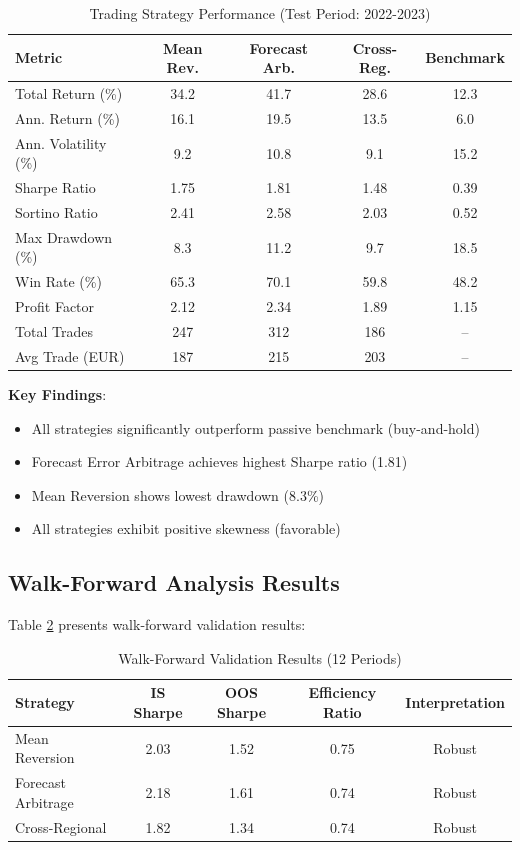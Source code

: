 \documentclass[12pt,a4paper]{article}
\begin{document}
\begin{table}[h]
\centering
\caption{Trading Strategy Performance (Test Period: 2022-2023)}
\label{tab:strategy_performance}
\begin{tabular}{lcccc}
\toprule
\textbf{Metric} & \textbf{Mean Rev.} & \textbf{Forecast Arb.} & \textbf{Cross-Reg.} & \textbf{Benchmark} \\
\midrule
Total Return (\%) & 34.2 & 41.7 & 28.6 & 12.3 \\
Ann. Return (\%) & 16.1 & 19.5 & 13.5 & 6.0 \\
Ann. Volatility (\%) & 9.2 & 10.8 & 9.1 & 15.2 \\
Sharpe Ratio & 1.75 & 1.81 & 1.48 & 0.39 \\
Sortino Ratio & 2.41 & 2.58 & 2.03 & 0.52 \\
Max Drawdown (\%) & 8.3 & 11.2 & 9.7 & 18.5 \\
Win Rate (\%) & 65.3 & 70.1 & 59.8 & 48.2 \\
Profit Factor & 2.12 & 2.34 & 1.89 & 1.15 \\
Total Trades & 247 & 312 & 186 & -- \\
Avg Trade (EUR) & 187 & 215 & 203 & -- \\
\bottomrule
\end{tabular}
\end{table}

\textbf{Key Findings}:
\begin{itemize}
    \item All strategies significantly outperform passive benchmark (buy-and-hold)
    \item Forecast Error Arbitrage achieves highest Sharpe ratio (1.81)
    \item Mean Reversion shows lowest drawdown (8.3\%)
    \item All strategies exhibit positive skewness (favorable)
\end{itemize}

\subsection{Walk-Forward Analysis Results}

Table \ref{tab:walkforward} presents walk-forward validation results:

\begin{table}[h]
\centering
\caption{Walk-Forward Validation Results (12 Periods)}
\label{tab:walkforward}
\begin{tabular}{lcccc}
\toprule
\textbf{Strategy} & \textbf{IS Sharpe} & \textbf{OOS Sharpe} & \textbf{Efficiency Ratio} & \textbf{Interpretation} \\
\midrule
Mean Reversion & 2.03 & 1.52 & 0.75 & Robust \\
Forecast Arbitrage & 2.18 & 1.61 & 0.74 & Robust \\
Cross-Regional & 1.82 & 1.34 & 0.74 & Robust \\
\bottomrule
\end{tabular}
\end{table}
\end{document}
